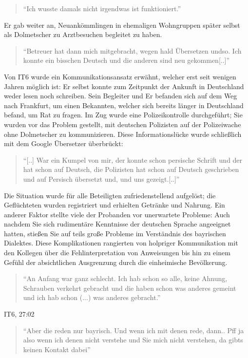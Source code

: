 \begin{quote}
    ``Ich wusste damals nicht irgendwas ist funktioniert.''
\end{quote}
Er gab weiter an, Neuankömmlingen in ehemaligen Wohngruppen später selbst als Dolmetscher zu Arztbesuchen begleitet zu haben.
\begin{quote}
    ``Betreuer hat dann mich mitgebracht, wegen hald Übersetzen undso. Ich konnte ein bisschen Deutsch und die anderen sind neu gekommen[..]''
\end{quote}
Von IT6 wurde ein Kommunikationsansatz erwähnt, welcher erst seit wenigen Jahren möglich ist:\newline
Er selbst konnte zum Zeitpunkt der Ankunft in Deutschland weder lesen noch schreiben. Sein Begleiter und Er befanden sich auf dem Weg nach Frankfurt, um einen Bekannten, welcher sich bereits länger in Deutschland befand, um Rat zu fragen. Im Zug wurde eine Polizeikontrolle durchgeführt; Sie wurden vor das Problem gestellt, mit deutschen Polizisten auf der Polizeiwache ohne Dolmetscher zu kommunizieren. Diese Informationslücke wurde schließlich mit dem Google Übersetzer überbrückt:
\begin{quote}
    ``[..] War ein Kumpel von mir, der konnte schon persische Schrift und der hat schon auf Deutsch, die Polizisten hat schon auf Deutsch geschrieben und auf Persisch übersetzt und, und uns gezeigt.[..]''
\end{quote}
Die Situation wurde für alle Beteiligten zufriedenstellend aufgelöst; die Geflüchteten wurden registriert und erhielten Getränke und Nahrung.
Ein anderer Faktor stellte viele der Probanden vor unerwartete Probleme:\newline
Auch nachdem Sie sich rudimentäre Kenntnisse der deutschen Sprache angeeignet hatten, stießen Sie auf teils große Probleme im Verständnis des bayrischen Dialektes. Diese Komplikationen rangierten von holpriger Kommunikation mit den Kollegen über die Fehlinterpretation von Anweisungen bis hin zu einem Gefühl der absichtlichen Ausgrenzung durch die einheimische Bevölkerung. \newline
\begin{quote}
    ``An Anfang war ganz schlecht. Ich hab schon so alle, keine Ahnung, Schrauben verkehrt gebracht und die haben schon was anderes gemeint und ich hab schon (...) was anderes gebracht.''
\end{quote}
IT6, 27:02
\begin{quote}
    ``Aber die reden nur bayrisch. Und wenn ich mit denen rede, dann.. Pff ja also wenn ich denen nicht verstehe und Sie mich nicht verstehen, da gibts keinen Kontakt dabei''
\end{quote}
